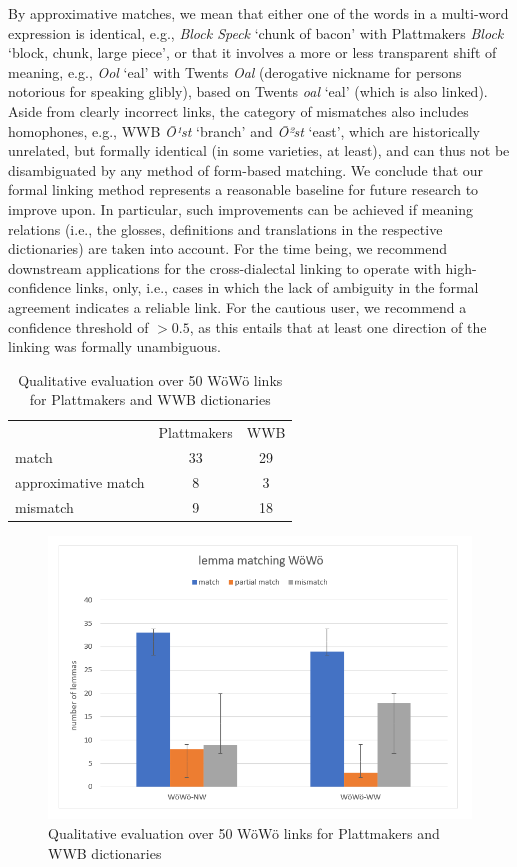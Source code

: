 \documentclass[11pt]{article}
\newcommand{\word}[1]{\textsl{#1}} %
\begin{document}
\begin{enumerate}
By approximative matches, we mean that either one of the words in a multi-word expression is identical, e.g., \word{Block Speck} `chunk of bacon' with Plattmakers \word{Block} `block, chunk, large piece', or that it involves a more or less transparent shift of meaning, e.g., \word{Ool} `eal' with Twents \word{Oal} (derogative nickname for persons notorious for speaking glibly), based on Twents \word{oal} `eal' (which is also linked). 
Aside from clearly incorrect links, the category of mismatches also includes homophones, e.g., WWB \word{Ō¹st} `branch' and \word{Ō²st} `east', which are historically unrelated, but formally identical (in some varieties, at least), and can thus not be disambiguated by any method of form-based matching.  We conclude that our formal linking method represents a reasonable baseline for future research to improve upon.
In particular, such improvements can be achieved if meaning relations (i.e., the glosses, definitions and translations in the respective dictionaries) are taken into account. 
For the time being, we recommend downstream applications for the cross-dialectal linking to operate with high-confidence links, only, i.e., cases in which the lack of ambiguity in the formal agreement indicates a reliable link. For the cautious user, we recommend a confidence threshold of $>0.5$, as this entails that at least one direction of the linking was formally unambiguous. 

\begin{table}
        \centering
        \begin{tabular}{lcc}
        & Plattmakers & WWB \\
        match & 33 & 29 \\
        approximative match & 8 & 3 \\
        mismatch & 9 & 18 \\
    \end{tabular}
    \caption{Qualitative evaluation over 50 WöWö links for Plattmakers and WWB dictionaries}
    \label{tab-eval}
\end{table}

\begin{figure}
    \centering
    \includegraphics[width=1\linewidth]{lemma-matching-woewoe.png}
    \caption{Qualitative evaluation over 50 WöWö links for Plattmakers and WWB dictionaries}
    \label{fig-eval}
\end{figure}



\end{enumerate}
\end{document}
